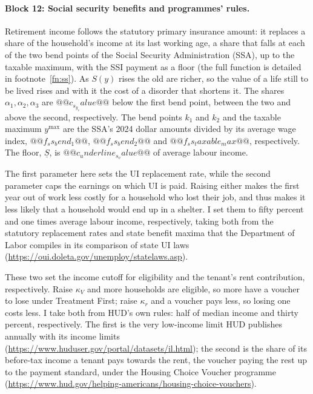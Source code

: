 \documentclass[10pt]{article}
\begin{document}
\paragraph{Block 12: Social security benefits and programmes' rules.}
\begin{description}\setlength{\itemsep}{0.25em}\setlength{\parskip}{0em}
\item[$S(y)$ and $\underline S$, social security and its floor.] Retirement income follows the statutory
primary insurance amount: it replaces a share of the household's income at its last working
age, a share that falls at each of the two bend points of the Social Security Administration (SSA), up to
the taxable maximum, with the SSI payment as a floor (the full function is detailed in footnote~\ref{fn:ss}). As $S(y)$ rises the old are richer, so the value of a life
still to be lived rises and with it the cost of a disorder that shortens it. The shares
$\alpha_1,\alpha_2,\alpha_3$ are $@@c_s_y_value@@$ below the first bend point, between the two and above the second, respectively. The
bend points $k_1$ and $k_2$ and the taxable maximum $y^{\max}$ are the SSA's 2024 dollar
amounts divided by its average wage index, $@@f_ss_bend_1@@$, $@@f_ss_bend_2@@$ and
$@@f_ss_taxable_max@@$, respectively. The floor, $\underline S$, is $@@c_underline_s_value@@$ of average
labour income.
\item[$\psi_{ui}$ and $\bar y$, UI.]   The first parameter here sets the UI replacement rate, while the second parameter caps the earnings on which UI is paid. Raising either makes the first year out of work less costly for a household who lost their job, and thus makes it less likely that a household would end up in a shelter. I set them to fifty percent and one
times average labour income, respectively, taking both from the statutory replacement rates
and state benefit maxima that the Department of Labor compiles in its comparison of
state UI laws
(\url{https://oui.doleta.gov/unemploy/statelaws.asp}).

\item[$\kappa_V$ and $\kappa_r$, the voucher rules.] These two set the income
cutoff for eligibility and the tenant's rent contribution, respectively. Raise $\kappa_V$ and more households are eligible, so more have a voucher to lose under Treatment First; raise $\kappa_r$ and a voucher pays less, so losing one costs less. I take both from HUD's own
rules: half of median income and thirty
percent, respectively. The first is the very low-income limit HUD publishes
annually with its income limits
(\url{https://www.huduser.gov/portal/datasets/il.html}); the second is the share of its before-tax income a tenant pays towards the rent, the voucher
paying the rest up to the payment standard, under the Housing Choice
Voucher programme
(\url{https://www.hud.gov/helping-americans/housing-choice-vouchers}).


\end{description}
\end{document}
